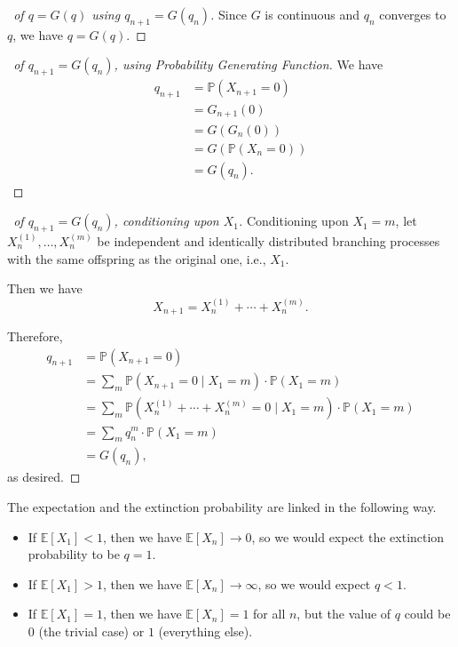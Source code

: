 \documentclass[11pt]{article}
\numberwithin{equation}{section}
\theoremstyle{definition}
\theoremstyle{remark}
\newcommand{\pqty}[1]{\left(#1\right)}
\newcommand{\bqty}[1]{\left[#1\right]}
\newcommand{\Prob}{\mathbb P}
\newcommand{\Expt}{\mathbb E}
\newcommand{\Conditional}[2]{#1\mid #2}
\begin{document}
\begin{proof}[\proofname\ of \(q = G\pqty{q}\) using \(q_{n + 1} = G\pqty{q_n}\)]\label{probability-proof-049}
    Since \(G\) is continuous and \(q_n\) converges to \(q\), we have \(q = G\pqty{q}\).
\end{proof}

\begin{proof}[\proofname\ of \(q_{n + 1} = G\pqty{q_n}\), using Probability Generating Function]\label{probability-proof-050}
    We have
    \begin{align*}
        q_{n + 1} &= \Prob\pqty{X_{n + 1} = 0} \\
        &= G_{n + 1}\pqty{0} \\
        &= G\pqty{G_{n} \pqty{0}} \\
        &= G\pqty{\Prob\pqty{X_n = 0}} \\
        &= G\pqty{q_n}.
    \end{align*}
\end{proof}

\begin{proof}[\proofname\ of \(q_{n + 1} = G\pqty{q_n}\), conditioning upon \(X_1\)]\label{probability-proof-051}
    Conditioning upon \(X_1 = m\), let \(X_n^{\pqty{1}}, \ldots, X_n^{\pqty{m}}\) be independent and identically distributed branching processes with the same offspring as the original one, i.e., \(X_1\).

    Then we have
    \[
        X_{n + 1} = X_{n}^{\pqty{1}} + \cdots + X_n^{\pqty{m}}.
    \]

    Therefore,
    \begin{align*}
        q_{n + 1} &= \Prob\pqty{X_{n + 1} = 0} \\
        &= \sum_{m} \Prob\pqty{\Conditional{X_{n + 1} = 0}{X_1 = m}} \cdot \Prob\pqty{X_1 = m} \\
        &= \sum_{m} \Prob\pqty{\Conditional{X_n^{\pqty{1}} + \cdots + X_n^{\pqty{m}} = 0}{X_1 = m}} \cdot \Prob\pqty{X_1 = m} \\
        &= \sum_{m} q_n^m \cdot \Prob\pqty{X_1 = m} \\
        &= G\pqty{q_n},
    \end{align*}
    as desired.
\end{proof}

The expectation and the extinction probability are linked in the following way.

\begin{itemize}
    \item If \(\Expt\bqty{X_1} < 1\), then we have \(\Expt\bqty{X_n} \to 0\), so we would expect the extinction probability to be \(q = 1\).

    \item If \(\Expt\bqty{X_1} > 1\), then we have \(\Expt\bqty{X_n} \to \infty\), so we would expect \(q < 1\).
    
    \item If \(\Expt\bqty{X_1} = 1\), then we have \(\Expt\bqty{X_n} = 1\) for all \(n\), but the value of \(q\) could be \(0\) (the trivial case) or \(1\) (everything else).
\end{itemize}
\end{document}
